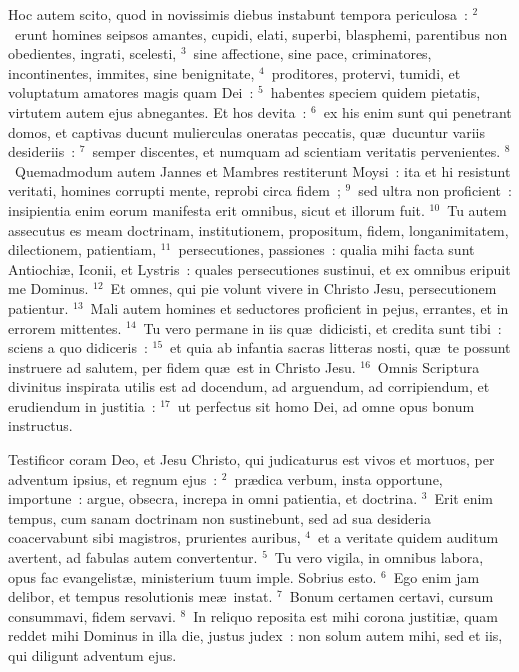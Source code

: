 \bchapter
\lettrine[lines=3,image=true,loversize=0.05,lraise=-0.03]{H}{}oc autem scito, quod in novissimis diebus instabunt tempora periculosa~:
${}^{2}$~erunt homines seipsos amantes, cupidi, elati, superbi, blasphemi, parentibus non obedientes, ingrati, scelesti,
${}^{3}$~sine affectione, sine pace, criminatores, incontinentes, immites, sine benignitate,
${}^{4}$~proditores, protervi, tumidi, et voluptatum amatores magis quam Dei~:
${}^{5}$~habentes speciem quidem pietatis, virtutem autem ejus abnegantes. Et hos devita~:
${}^{6}$~ex his enim sunt qui penetrant domos, et captivas ducunt mulierculas oneratas peccatis, qu\ae\ ducuntur variis desideriis~:
${}^{7}$~semper discentes, et numquam ad scientiam veritatis pervenientes.
${}^{8}$~Quemadmodum autem Jannes et Mambres restiterunt Moysi~: ita et hi resistunt veritati, homines corrupti mente, reprobi circa fidem~;
${}^{9}$~sed ultra non proficient~: insipientia enim eorum manifesta erit omnibus, sicut et illorum fuit.
${}^{10}$~Tu autem assecutus es meam doctrinam, institutionem, propositum, fidem, longanimitatem, dilectionem, patientiam,
${}^{11}$~persecutiones, passiones~: qualia mihi facta sunt Antiochi\ae , Iconii, et Lystris~: quales persecutiones sustinui, et ex omnibus eripuit me Dominus.
${}^{12}$~Et omnes, qui pie volunt vivere in Christo Jesu, persecutionem patientur.
${}^{13}$~Mali autem homines et seductores proficient in pejus, errantes, et in errorem mittentes.
${}^{14}$~Tu vero permane in iis qu\ae\ didicisti, et credita sunt tibi~: sciens a quo didiceris~:
${}^{15}$~et quia ab infantia sacras litteras nosti, qu\ae\ te possunt instruere ad salutem, per fidem qu\ae\ est in Christo Jesu.
${}^{16}$~Omnis Scriptura divinitus inspirata utilis est ad docendum, ad arguendum, ad corripiendum, et erudiendum in justitia~:
${}^{17}$~ut perfectus sit homo Dei, ad omne opus bonum instructus.

\bchapter
\lettrine[lines=3,image=true,loversize=0.05,lraise=-0.03]{T}{}estificor coram Deo, et Jesu Christo, qui judicaturus est vivos et mortuos, per adventum ipsius, et regnum ejus~:
${}^{2}$~pr\ae dica verbum, insta opportune, importune~: argue, obsecra, increpa in omni patientia, et doctrina.
${}^{3}$~Erit enim tempus, cum sanam doctrinam non sustinebunt, sed ad sua desideria coacervabunt sibi magistros, prurientes auribus,
${}^{4}$~et a veritate quidem auditum avertent, ad fabulas autem convertentur.
${}^{5}$~Tu vero vigila, in omnibus labora, opus fac evangelist\ae , ministerium tuum imple. Sobrius esto.
${}^{6}$~Ego enim jam delibor, et tempus resolutionis me\ae\ instat.
${}^{7}$~Bonum certamen certavi, cursum consummavi, fidem servavi.
${}^{8}$~In reliquo reposita est mihi corona justiti\ae , quam reddet mihi Dominus in illa die, justus judex~: non solum autem mihi, sed et iis, qui diligunt adventum ejus.

